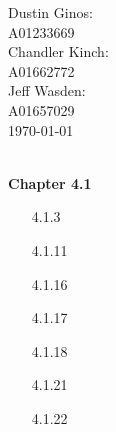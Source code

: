 \documentclass[10pt,twoside,reqno]{article}
\begin{document}
\begin{flushright}
\begin{minipage}{.25\textwidth}
Dustin Ginos: \\
A01233669\\
Chandler Kinch: \\
A01662772\\
Jeff Wasden: \\
A01657029\\

\today
\end{minipage}
\end{flushright}

\\
\vspace{5mm}
\textbf{Chapter 4.1}
\begin{enumerate}
\item[4.1.3]
\item[4.1.11]
\vspace{3mm}

\vspace{3mm}
\item[4.1.16]
\vspace{3mm}

\vspace{3mm}
\item[4.1.17]
\vspace{3mm}

\vspace{3mm}
\item[4.1.18]
\vspace{3mm}

\vspace{3mm}
\item[4.1.21]
\vspace{3mm}

\vspace{3mm}
\item[4.1.22]
\vspace{3mm}


\end{enumerate}
\end{document}
